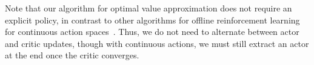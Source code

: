 \documentclass{article} %
\begin{document}
Note that our algorithm for optimal value approximation does not require an explicit policy, in contrast to other algorithms for offline reinforcement learning for continuous action spaces~\citep{fujimoto2019off, fujimoto2021minimalist, wu2019behavior, kostrikov2021offline, kumar2019stabilizing, kumar2020conservative}. Thus, we do not need to alternate between actor and critic updates, though with continuous actions, we must still extract an actor at the end once the critic converges.
\end{document}
